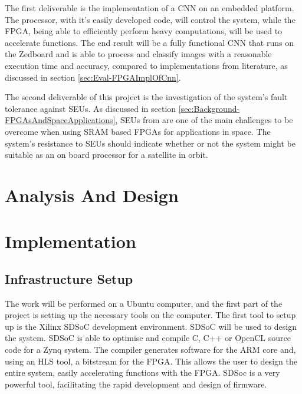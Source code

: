 \documentclass[12pt]{article}
\begin{document}
 The first deliverable is the implementation of a CNN on an embedded platform.  The processor, with it's easily developed code, will control the system, while the FPGA, being able to efficiently perform heavy computations, will be used to accelerate functions. The end result will be a fully functional CNN that runs on the Zedboard and is able to process and classify images with a reasonable execution time and accuracy, compared to implementations from literature, as discussed in section \ref{sec:Eval-FPGAImplOfCnn}.

The second deliverable of this project is the investigation of the system's fault tolerance against SEUs. As discussed in section \ref{sec:Background-FPGAsAndSpaceApplications}, SEUs from are one of the main challenges to be overcome when using SRAM based FPGAs for applications in space. The system's resistance to SEUs should indicate whether or not the system might be suitable as an on board processor for a satellite in orbit.

\newpage

\section{Analysis And Design}
\label{AnD}
\vspace{-12pt}

\newpage

\section{Implementation}
\label{sec:Imp}
\vspace{-12pt}

\subsection{Infrastructure Setup}
\label{sec:Imp-InfSetup}
\vspace{-12pt}

The work will be performed on a Ubuntu computer, and the first part of the project is setting up the necessary tools on the computer. The first tool to setup up is the Xilinx SDSoC development environment. SDSoC will be used to design the system. SDSoC is able to optimise and compile C, C++ or OpenCL source code for a Zynq system. The compiler generates software for the ARM core and, using an HLS tool, a bitstream for the FPGA. This allows the user to design the entire system, easily accelerating functions with the FPGA. SDSoc is a very powerful tool, facilitating the rapid development and design of firmware.
\end{document}
